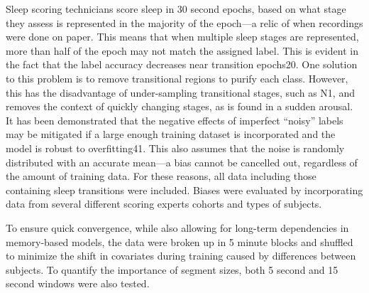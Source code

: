 Sleep scoring technicians score sleep in 30 second epochs, based on what stage they assess is represented in the majority of the epoch—a relic of when recordings were done on paper. This means that when multiple sleep stages are represented, more than half of the epoch may not match the assigned label. This is evident in the fact that the label accuracy decreases near transition epochs20. One solution to this problem is to remove transitional regions to purify each class. However, this has the disadvantage of under-sampling transitional stages, such as N1, and removes the context of quickly changing stages, as is found in a sudden arousal. It has been demonstrated that the negative effects of imperfect “noisy” labels may be mitigated if a large enough training dataset is incorporated and the model is robust to overfitting41. This also assumes that the noise is randomly distributed with an accurate mean—a bias cannot be cancelled out, regardless of the amount of training data. For these reasons, all data including those containing sleep transitions were included. Biases were evaluated by incorporating data from several different scoring experts cohorts and types of subjects.

To ensure quick convergence, while also allowing for long-term dependencies in memory-based models, the data were broken up in 5 minute blocks and shuffled to minimize the shift in covariates during training caused by differences between subjects. To quantify the importance of segment sizes, both 5 second and 15 second windows were also tested.

